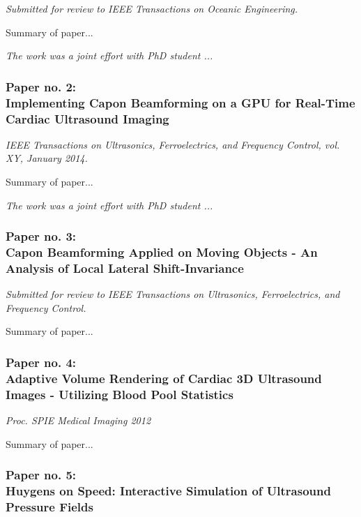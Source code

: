 \vspace{0.3 cm}
{\it Submitted for review to IEEE Transactions on Oceanic Engineering.}
\vspace{0.3 cm}

Summary of paper...

\vspace{0.3 cm}
\emph{The work was a joint effort with PhD student ...}


\subsubsection{Paper no. 2:\\
Implementing Capon Beamforming on a GPU for Real-Time Cardiac Ultrasound Imaging}

\vspace{0.3 cm}
{\it IEEE Transactions on Ultrasonics, Ferroelectrics, and Frequency Control, vol. XY, January 2014.}
\vspace{0.3 cm}

Summary of paper...
 
\vspace{0.3 cm}
\emph{The work was a joint effort with PhD student ...}

\subsubsection{Paper no. 3:\\
Capon Beamforming Applied on Moving Objects - An Analysis of Local Lateral Shift-Invariance}

\vspace{0.3 cm}
{\it Submitted for review to IEEE Transactions on Ultrasonics, Ferroelectrics, and Frequency Control.}
\vspace{0.3 cm}

Summary of paper...

\subsubsection{Paper no. 4:\\
Adaptive Volume Rendering of Cardiac 3D Ultrasound Images - Utilizing Blood Pool Statistics}

\vspace{0.3 cm}
{\it Proc. SPIE Medical Imaging 2012}
\vspace{0.3 cm}

Summary of paper...

\subsubsection{Paper no. 5:\\
Huygens on Speed: Interactive Simulation of Ultrasound Pressure Fields}

